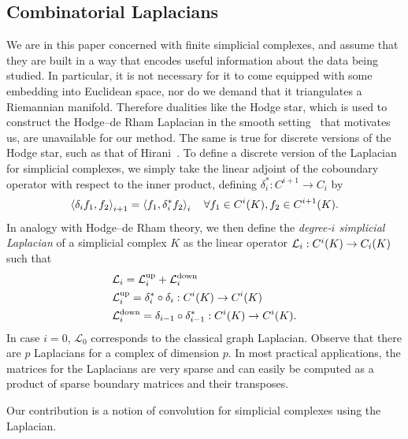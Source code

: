 \subsection{Combinatorial Laplacians}
We are in this paper concerned with finite simplicial complexes, and assume that they are built in a way that encodes useful information about the data being studied. In particular, it is not necessary for it to come equipped with some embedding into Euclidean space, nor do we demand that it triangulates a Riemannian manifold. Therefore dualities like the Hodge star, which is used to construct the Hodge--de Rham Laplacian in the smooth setting~\cite{madsen1997calculus} that motivates us, are unavailable for our method. The same is true for discrete versions of the Hodge star, such as that of Hirani~\cite{hirani2003thesis}. To define a discrete version of the Laplacian for simplicial complexes, we simply take the linear adjoint of the coboundary operator with respect to the inner product, defining $\delta_i^\ast:C^{i+1}\to C_i$ by
\begin{align*}
  \left\langle \delta_i f_1 , f_2 \right\rangle_{i+1} =\left\langle f_1 , \delta_i^\ast f_2 \right\rangle_{i} \quad \forall f_1\in C^{i}(K), f_2 \in C^{i+1}(K).
\end{align*}
In analogy with Hodge--de Rham theory, we then define the \emph{degree-$i$ simplicial Laplacian} of a simplicial complex $K$ as the linear operator $\mathcal{L}_i:C^i(K)\to C_i(K)$ such that
\begin{align*}
  &\mathcal{L}_i = \mathcal{L}^{\text{up}}_i + \mathcal{L}^{\text{down}}_i\\
  &\mathcal{L}^{\text{up}}_i =  \delta_{i}^\ast\circ\delta_{i} : C^i(K)\to C^i(K) \\
  &\mathcal{L}^{\text{down}}_i = \delta_{i-1}\circ\delta_{i-1}^\ast : C^i(K)\to C^i(K).
\end{align*}
In case $i=0$, $\mathcal{L}_0$ corresponds to the classical graph Laplacian. Observe that there are $p$ Laplacians for a complex of dimension $p$. In most practical applications, the matrices for the Laplacians are very sparse and can easily be computed as a product of sparse boundary matrices and their transposes.


Our contribution is a notion of convolution for simplicial complexes using the Laplacian.



